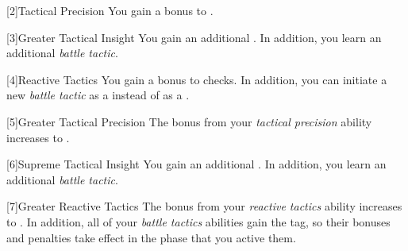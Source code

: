         [2]{Tactical Precision} You gain a  bonus to .

        [3]{Greater Tactical Insight} You gain an additional .
        In addition, you learn an additional \textit{battle tactic}.

        [4]{Reactive Tactics} You gain a  bonus to  checks.
        In addition, you can initiate a new \textit{battle tactic} as a  instead of as a .

        [5]{Greater Tactical Precision} The bonus from your \textit{tactical precision} ability increases to .

        [6]{Supreme Tactical Insight} You gain an additional .
        In addition, you learn an additional \textit{battle tactic}.

        [7]{Greater Reactive Tactics} The bonus from your \textit{reactive tactics} ability increases to .
        In addition, all of your \textit{battle tactics} abilities gain the  tag, so their bonuses and penalties take effect in the phase that you active them.

\newpage
